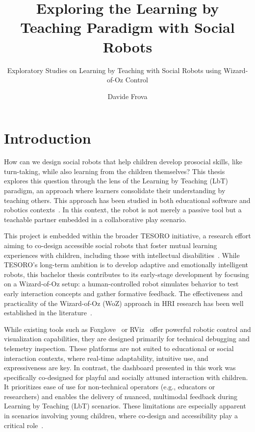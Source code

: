 \documentclass[a4paper]{usiinfbachelorproject}
\author{Davide Frova}
\title{\textbf{Exploring the Learning by Teaching Paradigm with Social Robots}}
\subtitle{Exploratory Studies on Learning by Teaching with Social Robots using Wizard-of-Oz Control}
\begin{document}
\maketitle
\tableofcontents\newpage

\section{\textbf{Introduction}}

How can we design social robots that help children develop prosocial skills, like turn-taking, while also learning from the children themselves?
This thesis explores this question through the lens of the Learning by Teaching (LbT) paradigm, an approach where learners consolidate their understanding by teaching others.
This approach has been studied in both educational software and robotics contexts~\cite{biswas2005learning, 10.5898/JHRI.1.1.Tanaka}.
In this context, the robot is not merely a passive tool but a teachable partner embedded in a collaborative play scenario.

This project is embedded within the broader TESORO initiative, a research effort aiming to co-design accessible social robots that foster mutual learning experiences with children, including those with intellectual disabilities~\cite{landoni2025tesoro}.
While TESORO's long-term ambition is to develop adaptive and emotionally intelligent robots, this bachelor thesis contributes to its early-stage development by focusing on a Wizard-of-Oz setup: a human-controlled robot simulates behavior to test early interaction concepts and gather formative feedback.
The effectiveness and practicality of the Wizard-of-Oz (WoZ) approach in HRI research has been well established in the literature~\cite{weiss2010userWOZ, rietz2021woz4uPepper, SCHOONDERWOERD2022102831}.

While existing tools such as Foxglove~\cite{foxglove} or RViz~\cite{rviz2} offer powerful robotic control and visualization capabilities, they are designed primarily for technical debugging and telemetry inspection.
These platforms are not suited to educational or social interaction contexts, where real-time adaptability, intuitive use, and expressiveness are key.
In contrast, the dashboard presented in this work was specifically co-designed for playful and socially attuned interaction with children.
It prioritizes ease of use for non-technical operators (e.g., educators or researchers) and enables the delivery of nuanced, multimodal feedback during Learning by Teaching (LbT) scenarios.
These limitations are especially apparent in scenarios involving young children, where co-design and accessibility play a critical role~\cite{osti_10386132, rose2019participatory}.
\end{document}
